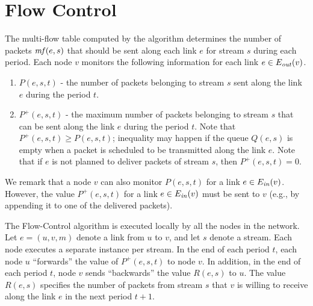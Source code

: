 \documentclass[12pt,oneside,english,a4paper]{book}
\theoremstyle{plain}
\theoremstyle{definition}
\theoremstyle{Theorem}
\theoremstyle{plain}
\newenvironment{proof sketch}[1]{\noindent {\emph{Proof sketch of #1:}}}{\hfill \qed}
\newcommand{\mf}{\text{\emph{mf}}}
\newcommand{\Ein}{E_{\text{\emph{in}}}}
\newcommand{\Eout}{E_{\text{\emph{out}}}}
\begin{document}
\chapter{Flow Control}\label{sec:flow control}
The multi-flow table computed by the algorithm determines the number of packets $\mf(e,s)$
that should be sent along each link $e$ for stream $s$ during each period.
Each node $v$ monitors the following information for each link $e \in \Eout (v)$.
\begin{enumerate}
\item $P(e,s,t)$ - the number of packets belonging to stream $s$ sent
  along the link $e$ during the period $t$.
\item $P^+(e,s,t)$ - the maximum number of packets belonging to stream
  $s$ that can be sent along the link $e$ during the period $t$. Note
  that $P^+(e,s,t)\geq P(e,s,t)$; inequality may happen if the queue
  $Q(e,s)$ is empty when a packet is scheduled to be transmitted along
  the link $e$. Note that if $e$ is not planned to deliver packets of
  stream $s$, then $P^+(e,s,t)=0$.
\end{enumerate}
We remark that a node $v$ can also monitor $P(e,s,t)$ for a link $e\in
\Ein(v)$.  However, the value $P^+(e,s,t)$ for a link $e\in \Ein(v)$
must be sent to $v$ (e.g., by appending it to one of the delivered
packets).

The Flow-Control algorithm is executed locally by all the nodes in the
network. Let $e=(u,v,m)$ denote a link from $u$ to $v$, and let $s$
denote a stream. Each node executes a separate instance per stream.
In the end of each period $t$, each node $u$ ``forwards'' the value of
$P^+(e,s,t)$ to node $v$.  In addition, in the end of each period $t$,
node $v$ sends ``backwards'' the value $R(e,s)$ to $u$. The value
$R(e,s)$ specifies the number of packets from stream $s$ that $v$ is
willing to receive along the link $e$ in the next period
$t+1$.
\end{document}
